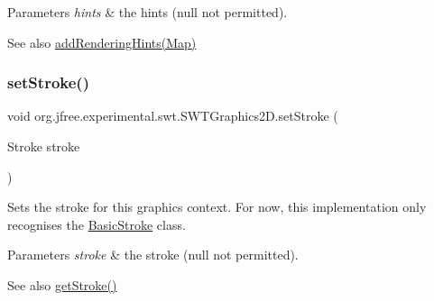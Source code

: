 \begin{DoxyParams}{Parameters}
{\em hints} & the hints ({\ttfamily null} not permitted).\\
\hline
\end{DoxyParams}
\begin{DoxySeeAlso}{See also}
\mbox{\hyperlink{classorg_1_1jfree_1_1experimental_1_1swt_1_1_s_w_t_graphics2_d_ab7a602eb7f5ad020d212c36ddfdfd44c}{add\+Rendering\+Hints(\+Map)}} 
\end{DoxySeeAlso}
\mbox{\label{classorg_1_1jfree_1_1experimental_1_1swt_1_1_s_w_t_graphics2_d_a90d9530e375f481dca4ea8a0b75372ca}} 
\subsubsection{\texorpdfstring{set\+Stroke()}{setStroke()}}
{\footnotesize\ttfamily void org.\+jfree.\+experimental.\+swt.\+S\+W\+T\+Graphics2\+D.\+set\+Stroke (\begin{DoxyParamCaption}\item[{Stroke}]{stroke }\end{DoxyParamCaption})}

Sets the stroke for this graphics context. For now, this implementation only recognises the \mbox{\hyperlink{}{Basic\+Stroke}} class.


\begin{DoxyParams}{Parameters}
{\em stroke} & the stroke ({\ttfamily null} not permitted).\\
\hline
\end{DoxyParams}
\begin{DoxySeeAlso}{See also}
\mbox{\hyperlink{classorg_1_1jfree_1_1experimental_1_1swt_1_1_s_w_t_graphics2_d_ab44f8c6b4ef40396fa3c34e7be4b2b7a}{get\+Stroke()}} 
\end{DoxySeeAlso}
\mbox{\label{classorg_1_1jfree_1_1experimental_1_1swt_1_1_s_w_t_graphics2_d_a08e83ee8a8eff2b35fa53a33254652f3}} 
